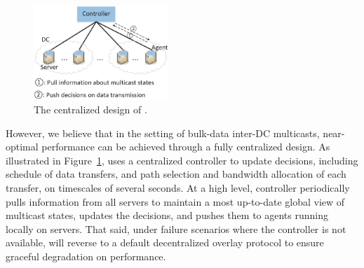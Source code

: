 \begin{figure}[t]
  \centering
  \includegraphics[width=2in]{images/framework.eps}
  \caption{The centralized design of \name.}
  \label{fig:framework}
\vspace{-0.4cm}
\end{figure}

However, we believe that in the setting of bulk-data inter-DC
multicasts, near-optimal performance can be achieved
through a fully centralized design.
As illustrated in Figure~\ref{fig:framework}, \name uses a centralized controller to update decisions,
including schedule of data transfers, and path selection and
bandwidth allocation of each transfer, on timescales of
several seconds.
At a high level, \name controller periodically pulls information
from all servers to maintain a most up-to-date global view of
multicast states, updates the decisions, and pushes them
to agents running locally on servers.
That said, under failure scenarios where the controller is
not available, \name will reverse to a default decentralized
overlay protocol to ensure graceful degradation on performance.

